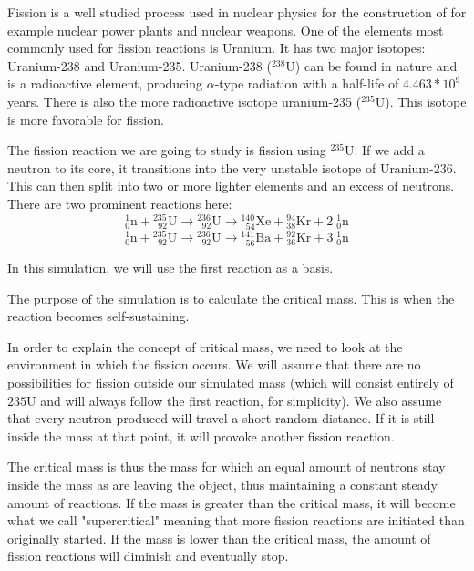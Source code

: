 Fission is a well studied process used in nuclear physics for the construction of for example nuclear power plants and nuclear weapons. One of the elements most commonly used for fission reactions is Uranium. It has two major isotopes: Uranium-238 and Uranium-235. Uranium-238 ($^{238}$U) can be found in nature and is a radioactive element, producing $\alpha$-type radiation with a half-life of $4.463*10^9$ years. There is also the more radioactive isotope uranium-235 ($^{235}$U). This isotope is more favorable for fission. 

The fission reaction we are going to study is fission using $^{235}$U. If we add a neutron to its core, it transitions into the very unstable isotope of Uranium-236. This can then split into two or more lighter elements and an excess of neutrons. There are two prominent reactions here:
\[
{^{1}_0\text{n}}+{^{235}_{\;\;92}\text{U}}\rightarrow{^{236}_{\;\;92}\text{U}}\rightarrow{^{140}_{\;\;54}\text{Xe}}+{^{94}_{38}\text{Kr}}+2\;{^1_0\text{n}}
\]
\[
{^{1}_0\text{n}}+{^{235}_{\;\;92}\text{U}}\rightarrow{^{236}_{\;\;92}\text{U}}\rightarrow{^{141}_{\;\;56}\text{Ba}}+{^{92}_{36}\text{Kr}}+3\;{^1_0\text{n}}
\]

In this simulation, we will use the first reaction as a basis.

The purpose of the simulation is to calculate the critical mass. This is when the reaction becomes self-sustaining.

In order to explain the concept of critical mass, we need to look at the environment in which the fission occurs. We will assume that there are no possibilities for fission outside our simulated mass (which will consist entirely of ${235}$U and will always follow the first reaction, for simplicity). We also assume that every neutron produced will travel a short random distance. If it is still inside the mass at that point, it will provoke another fission reaction.

The critical mass is thus the mass for which an equal amount of neutrons stay inside the mass as are leaving the object, thus maintaining a constant steady amount of reactions. If the mass is greater than the critical mass, it will become what we call "supercritical" meaning that more fission reactions are initiated than originally started. If the mass is lower than the critical mass, the amount of fission reactions will diminish and eventually stop.